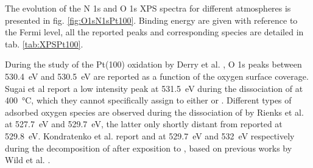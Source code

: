The evolution of the N 1s and O 1s XPS spectra for different atmospheres is presented in fig. \ref{fig:O1sN1sPt100}.
Binding energy are given with reference to the Fermi level, all the reported peaks and corresponding species are detailed in tab. \ref{tab:XPSPt100}.

During the study of the Pt(100) oxidation by Derry et al. \parencite*{Derry1984}, O 1s peaks between \qty{530.4}{\eV} and \qty{530.5}{\eV} are reported as a function of the oxygen surface coverage.
Sugai et al \parencite*{Sugai1993} report a low intensity peak at \qty{531.5}{\eV} during the dissociation of  at \qty{400}{\degreeCelsius}, which they cannot specifically assign to either  or .
Different types of adsorbed oxygen species are observed during the dissociation of  by Rienks et al. \parencite*{Rienks2003} at \qty{527.7}{\eV} and \qty{529.7}{\eV}, the latter only shortly distant from  reported at \qty{529.8}{\eV}.
Kondratenko et al. \parencite*{Kondratenko2006} report  and  at \qty{529.7}{\eV} and \qty{532}{\eV} respectively during the decomposition of  after exposition to , based on previous works by Wild et al. \parencite*{Wild2000}.

